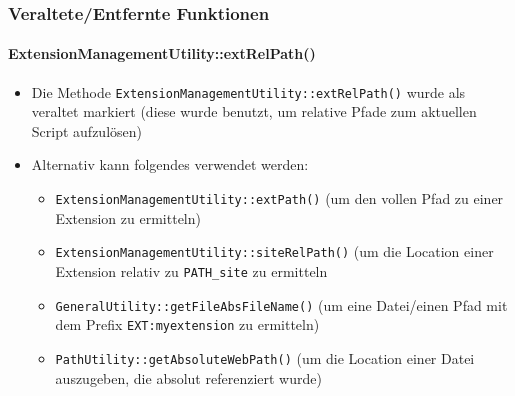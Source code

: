 \begin{frame}[fragile]
	\frametitle{Veraltete/Entfernte Funktionen}
	\framesubtitle{ExtensionManagementUtility::extRelPath()}

	\begin{itemize}

		\item Die Methode \texttt{ExtensionManagementUtility::extRelPath()} wurde als veraltet markiert\newline
			\small(diese wurde benutzt, um relative Pfade zum aktuellen Script aufzulösen)\normalsize
		\item Alternativ kann folgendes verwendet werden:

			\begin{itemize}
				\item \texttt{ExtensionManagementUtility::extPath()}\newline
					\smaller(um den vollen Pfad zu einer Extension zu ermitteln)\normalsize
				\item \texttt{ExtensionManagementUtility::siteRelPath()}\newline
					\smaller(um die Location einer Extension relativ zu \texttt{PATH\_site} zu ermitteln\normalsize
				\item \texttt{GeneralUtility::getFileAbsFileName()}\newline
					\smaller(um eine Datei/einen Pfad mit dem Prefix \texttt{EXT:myextension} zu ermitteln)\normalsize
				\item \texttt{PathUtility::getAbsoluteWebPath()}\newline
					\smaller(um die Location einer Datei auszugeben, die absolut referenziert wurde)\normalsize
			\end{itemize}

	\end{itemize}

\end{frame}


